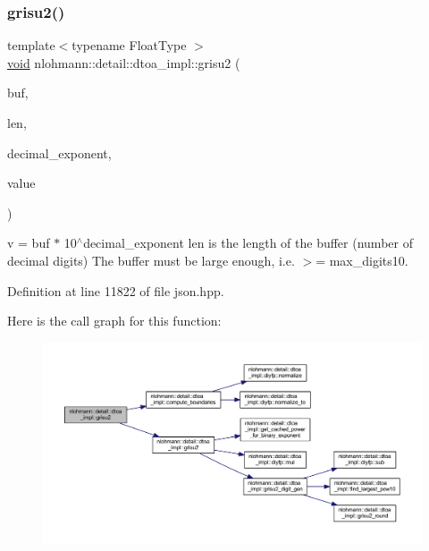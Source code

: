 \subsubsection{\texorpdfstring{grisu2()}{grisu2()}\hspace{0.1cm}{\footnotesize\ttfamily [2/2]}}
{\footnotesize\ttfamily template$<$typename Float\+Type $>$ \\
\mbox{\hyperlink{namespacenlohmann_1_1detail_a59fca69799f6b9e366710cb9043aa77d}{void}} nlohmann\+::detail\+::dtoa\+\_\+impl\+::grisu2 (\begin{DoxyParamCaption}\item[{char $\ast$}]{buf,  }\item[{int \&}]{len,  }\item[{int \&}]{decimal\+\_\+exponent,  }\item[{Float\+Type}]{value }\end{DoxyParamCaption})}

v = buf $\ast$ 10$^\wedge$decimal\+\_\+exponent len is the length of the buffer (number of decimal digits) The buffer must be large enough, i.\+e. $>$= max\+\_\+digits10. 

Definition at line 11822 of file json.\+hpp.

Here is the call graph for this function\+:
\nopagebreak
\begin{figure}[H]
\begin{center}
\leavevmode
\includegraphics[width=350pt]{namespacenlohmann_1_1detail_1_1dtoa__impl_aab7a9670a4f4704a5d0347ad7588576b_cgraph}
\end{center}
\end{figure}
\mbox{\label{namespacenlohmann_1_1detail_1_1dtoa__impl_a9b899c72b0e1e3dd46d75c2b4e6bcdfb}} 
